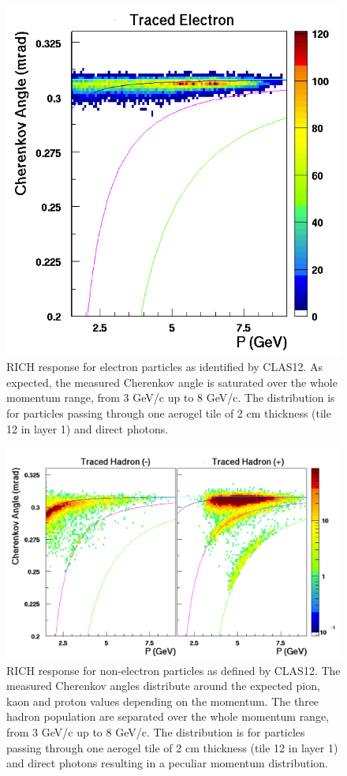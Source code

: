 \documentclass[final,5p,times,twocolumn]{elsarticle}
\begin{document}
\begin{figure}[t]
\begin{center}
\includegraphics[width=0.55\columnwidth]{EPS/Electron_PID.png}
\end{center}
\caption{RICH response for electron particles as identified by CLAS12. As expected, the measured Cherenkov angle
is saturated over the whole momentum range, from 3 GeV/c up to 8 GeV/c. The distribution is for particles
passing through one aerogel tile of 2 cm thickness (tile 12 in layer 1) and direct photons.}
\label{Fig:CHele}
\end{figure}

\begin{figure}[t]
\begin{center}
\includegraphics[width=1.0\columnwidth]{EPS/Hadrons_PID.png}
\end{center}
\caption{RICH response for non-electron particles as defined by CLAS12. The measured Cherenkov angles
distribute around the expected pion, kaon and proton values depending on the momentum. The three 
hadron population are separated over the whole momentum range, from 3 GeV/c up 
to 8 GeV/c. The distribution is for particles passing through one aerogel tile of 2 cm thickness (tile 12 
in layer 1) and direct photons resulting in a peculiar momentum distribution.}
\label{Fig:CHhad}
\end{figure}
\end{document}
